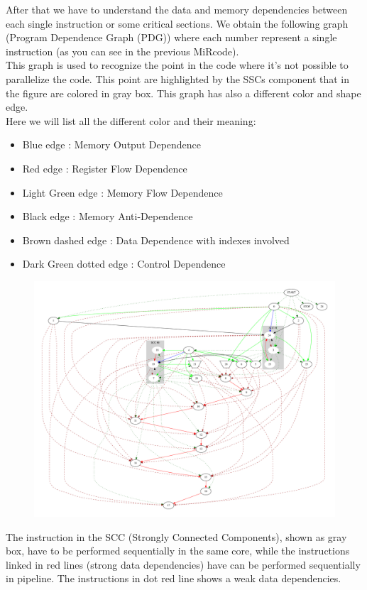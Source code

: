 After that we have to understand the data and memory dependencies between each single instruction or some critical sections.
We obtain the following graph (Program Dependence Graph (PDG)) where each number represent a single instruction (as you can see in the previous MiRcode).\\

 This graph is used to recognize the point in the code where it's not possible to parallelize the code. This point are highlighted by the SSCs component that in the figure are colored in gray box. This graph has also a different color and shape edge.\\
  Here we will list all the different color and their meaning: 
  \begin{itemize}
   \item Blue edge : Memory Output Dependence
   \item Red edge : Register Flow Dependence 
   \item Light Green edge : Memory Flow Dependence  
   \item Black edge : Memory Anti-Dependence
   \item Brown dashed edge : Data Dependence with indexes involved 
   \item Dark Green dotted edge : Control Dependence 
  \end{itemize}
  \begin{figure}[h!]
  	\centering
  	\includegraphics[width=\textwidth]{imm/tessa/PDGscc.pdf} 	\caption{
  	} 
  	\label{pdg}
  \end{figure}
The instruction in the SCC (Strongly Connected Components), shown as gray box, have to be performed sequentially in the same core, while the instructions linked in red lines (strong data dependencies) have can be performed sequentially in pipeline. The instructions in dot red line shows a weak data dependencies.